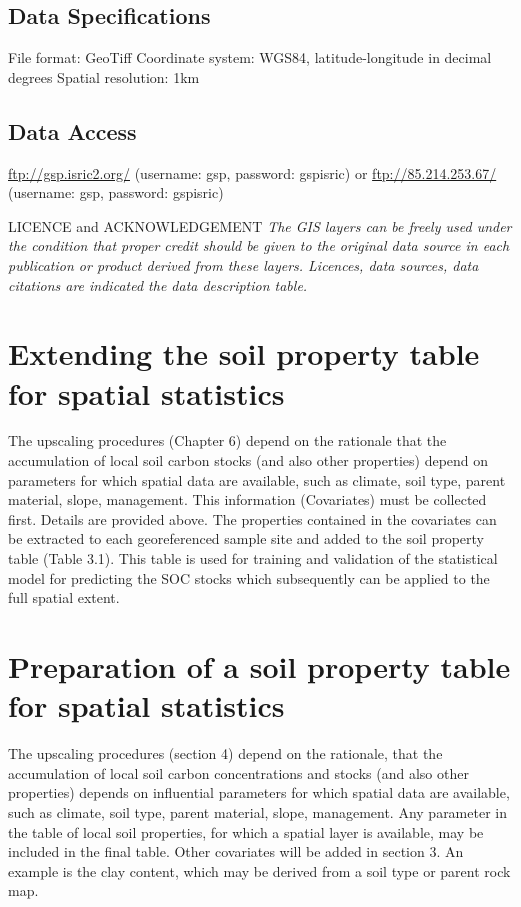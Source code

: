 \documentclass[]{book}
\theoremstyle{definition}
\theoremstyle{definition}
\theoremstyle{definition}
\theoremstyle{remark}
\begin{document}
\subsection{Data Specifications}\label{data-specifications}

File format: GeoTiff Coordinate system: WGS84, latitude-longitude in
decimal degrees Spatial resolution: 1km

\subsection{Data Access}\label{data-access}

\url{ftp://gsp.isric2.org/} (username: gsp, password: gspisric) or
\url{ftp://85.214.253.67/} (username: gsp, password: gspisric)

LICENCE and ACKNOWLEDGEMENT \emph{The GIS layers can be freely used
under the condition that proper credit should be given to the original
data source in each publication or product derived from these layers.
Licences, data sources, data citations are indicated the data
description table.}

\section{Extending the soil property table for spatial
statistics}\label{extending-the-soil-property-table-for-spatial-statistics}

The upscaling procedures (Chapter 6) depend on the rationale that the
accumulation of local soil carbon stocks (and also other properties)
depend on parameters for which spatial data are available, such as
climate, soil type, parent material, slope, management. This information
(Covariates) must be collected first. Details are provided above. The
properties contained in the covariates can be extracted to each
georeferenced sample site and added to the soil property table (Table
3.1). This table is used for training and validation of the statistical
model for predicting the SOC stocks which subsequently can be applied to
the full spatial extent.

\section{Preparation of a soil property table for spatial
statistics}\label{preparation-of-a-soil-property-table-for-spatial-statistics}

The upscaling procedures (section 4) depend on the rationale, that the
accumulation of local soil carbon concentrations and stocks (and also
other properties) depends on influential parameters for which spatial
data are available, such as climate, soil type, parent material, slope,
management. Any parameter in the table of local soil properties, for
which a spatial layer is available, may be included in the final table.
Other covariates will be added in section 3. An example is the clay
content, which may be derived from a soil type or parent rock map.
\end{document}
